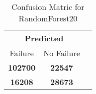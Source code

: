 \begin{table}[] 
\caption{Confusion Matric for RandomForest20} 
\label{Table: Prediction Accuracy-DMDRandomForest20OnlySunEKF-resetReflectionEKF-top2-Reflection} 
\centering 
\begin{tabular} 
 {@{}ccc@{}} 
\toprule 
\multicolumn{2}{c}{\textbf{Predicted}}
 \\ \midrule 
\multicolumn{1}{|c|}{Failure} & 
\multicolumn{1}{c|}{No Failure}
 \\ \midrule 
\multicolumn{1}{|c|}{\color{green}\textbf{102700}} & 
\multicolumn{1}{c|}{\color{red}\textbf{22547}}
 \\ \midrule 
\multicolumn{1}{|c|}{\color{red}\textbf{16208}} & 
\multicolumn{1}{c|}{\color{green}\textbf{28673}}
 \\ \bottomrule 
\end{tabular} 
\end{table} 
